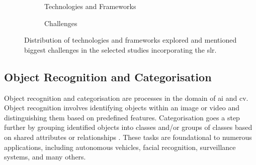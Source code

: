 \begin{figure}[!htb]
    \begin{subfigure}{1\linewidth}
        \centering
        \caption{Technologies and Frameworks}
    \end{subfigure}

    \vspace{0.5cm}

    \begin{subfigure}{1\linewidth}
        \centering
        \caption{Challenges}
    \end{subfigure}
    \centering
    \caption{Distribution of technologies and frameworks explored and mentioned biggest challenges in the selected studies incorporating the \acl{slr}.}
    \label{fig:prisma_results}
\end{figure}

\subsection{Object Recognition and Categorisation} \label{subsec:object-recognition}

Object recognition and categorisation are processes in the domain of \ac{ai} and \ac{cv}. Object recognition involves identifying objects within an image or video and distinguishing them based on predefined features. Categorisation goes a step further by grouping identified objects into classes and/or groups of classes based on shared attributes or relationships \cite{Liu2021}. These tasks are foundational to numerous applications, including autonomous vehicles, facial recognition, surveillance systems, and many others.

